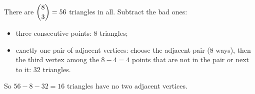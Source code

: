 There are $\dbinom83=56$ triangles in all. Subtract the bad ones:
\begin{itemize}
\item three consecutive points: $8$ triangles;
\item exactly one pair of adjacent vertices: choose the adjacent pair ($8$ ways), then the third vertex among the $8-4=4$ points that are not in the pair or next to it: $32$ triangles.
\end{itemize}
So $56-8-32=\boxed{16}$ triangles have no two adjacent vertices.
